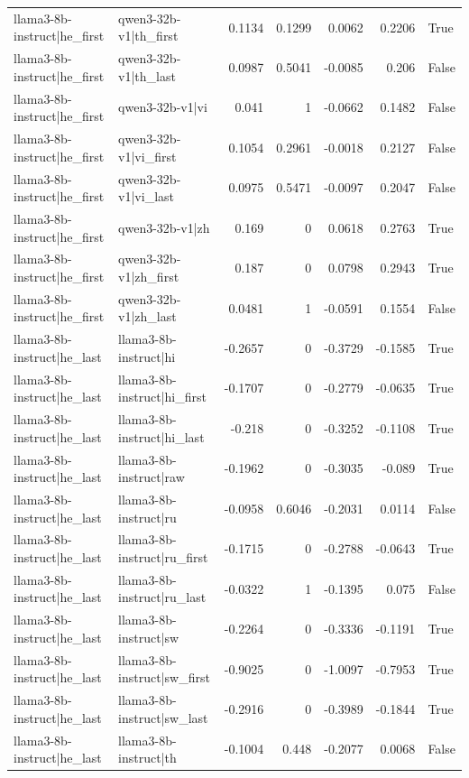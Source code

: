 \begin{table}
\begin{tabular}{l l r r r r l}
llama3-8b-instruct|he_first & qwen3-32b-v1|th_first & 0.1134 & 0.1299 & 0.0062 & 0.2206 & True \\
llama3-8b-instruct|he_first & qwen3-32b-v1|th_last & 0.0987 & 0.5041 & -0.0085 & 0.206 & False \\
llama3-8b-instruct|he_first & qwen3-32b-v1|vi & 0.041 & 1 & -0.0662 & 0.1482 & False \\
llama3-8b-instruct|he_first & qwen3-32b-v1|vi_first & 0.1054 & 0.2961 & -0.0018 & 0.2127 & False \\
llama3-8b-instruct|he_first & qwen3-32b-v1|vi_last & 0.0975 & 0.5471 & -0.0097 & 0.2047 & False \\
llama3-8b-instruct|he_first & qwen3-32b-v1|zh & 0.169 & 0 & 0.0618 & 0.2763 & True \\
llama3-8b-instruct|he_first & qwen3-32b-v1|zh_first & 0.187 & 0 & 0.0798 & 0.2943 & True \\
llama3-8b-instruct|he_first & qwen3-32b-v1|zh_last & 0.0481 & 1 & -0.0591 & 0.1554 & False \\
llama3-8b-instruct|he_last & llama3-8b-instruct|hi & -0.2657 & 0 & -0.3729 & -0.1585 & True \\
llama3-8b-instruct|he_last & llama3-8b-instruct|hi_first & -0.1707 & 0 & -0.2779 & -0.0635 & True \\
llama3-8b-instruct|he_last & llama3-8b-instruct|hi_last & -0.218 & 0 & -0.3252 & -0.1108 & True \\
llama3-8b-instruct|he_last & llama3-8b-instruct|raw & -0.1962 & 0 & -0.3035 & -0.089 & True \\
llama3-8b-instruct|he_last & llama3-8b-instruct|ru & -0.0958 & 0.6046 & -0.2031 & 0.0114 & False \\
llama3-8b-instruct|he_last & llama3-8b-instruct|ru_first & -0.1715 & 0 & -0.2788 & -0.0643 & True \\
llama3-8b-instruct|he_last & llama3-8b-instruct|ru_last & -0.0322 & 1 & -0.1395 & 0.075 & False \\
llama3-8b-instruct|he_last & llama3-8b-instruct|sw & -0.2264 & 0 & -0.3336 & -0.1191 & True \\
llama3-8b-instruct|he_last & llama3-8b-instruct|sw_first & -0.9025 & 0 & -1.0097 & -0.7953 & True \\
llama3-8b-instruct|he_last & llama3-8b-instruct|sw_last & -0.2916 & 0 & -0.3989 & -0.1844 & True \\
llama3-8b-instruct|he_last & llama3-8b-instruct|th & -0.1004 & 0.448 & -0.2077 & 0.0068 & False \\

\end{tabular}
\end{table}
